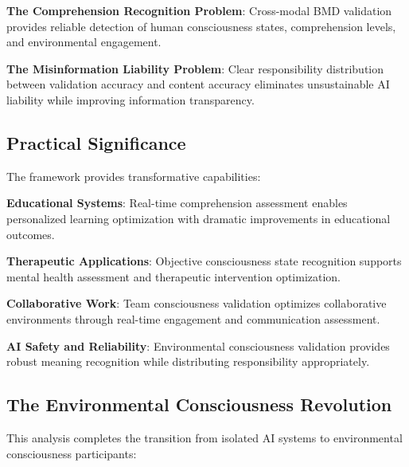 \documentclass[12pt,a4paper]{article}
\begin{document}
\textbf{The Comprehension Recognition Problem}: Cross-modal BMD validation provides reliable detection of human consciousness states, comprehension levels, and environmental engagement.

\textbf{The Misinformation Liability Problem}: Clear responsibility distribution between validation accuracy and content accuracy eliminates unsustainable AI liability while improving information transparency.

\subsection{Practical Significance}

The framework provides transformative capabilities:

\textbf{Educational Systems}: Real-time comprehension assessment enables personalized learning optimization with dramatic improvements in educational outcomes.

\textbf{Therapeutic Applications}: Objective consciousness state recognition supports mental health assessment and therapeutic intervention optimization.

\textbf{Collaborative Work}: Team consciousness validation optimizes collaborative environments through real-time engagement and communication assessment.

\textbf{AI Safety and Reliability}: Environmental consciousness validation provides robust meaning recognition while distributing responsibility appropriately.

\subsection{The Environmental Consciousness Revolution}

This analysis completes the transition from isolated AI systems to environmental consciousness participants:
\end{document}

